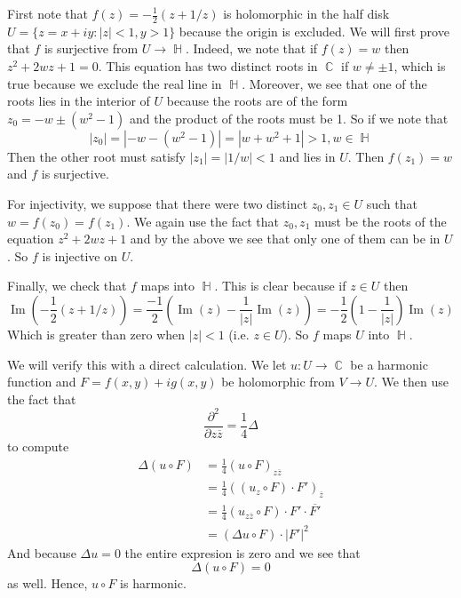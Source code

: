 \documentclass{article}
\DeclareMathOperator{\C}{\mathbb{C}}
\DeclareMathOperator{\Ha}{\mathbb{H}}
\DeclareMathOperator{\suchthat}{\mathrel{:}}
\newcommand{\exercise}[1]{\noindent{\textbf{Exercise #1:}}}
\newcommand{\der}[2]{\frac{\partial #1}{\partial #2}}
\newcommand{\conj}[1]{\overline{#1}}
\newcommand{\imag}{\mathrel{\text{Im}}}
\begin{document}
\exercise{8.5.5}

First note that $f(z) = -\frac{1}{2}(z + 1/z)$ is holomorphic in the
half disk $U = \{z = x+iy \suchthat |z| < 1, y>1\}$ because the origin
is excluded. We will first prove that $f$ is surjective from $U \to
\Ha$. Indeed, we note that if $f(z) = w$ then $z^2+2wz+1 = 0$. This
equation has two distinct roots in $\C$ if $w \neq \pm 1$, which is
true because we exclude the real line in $\Ha$. Moreover, we see that
one of the roots lies in the interior of $U$ because the roots
are of the form $z_0 = -w \pm (w^2-1)$ and the product of the roots
must be 1. So if we note that
\[
|z_0| = |-w - (w^2-1)| = |w+w^2+1| > 1, w \in \Ha
\]
Then the other root must satisfy $|z_1| = |1/w| < 1$ and lies in
$U$. Then $f(z_1) = w$ and $f$ is surjective.

For injectivity, we suppose that there were two distinct $z_0,z_1 \in
U$ such that $w = f(z_0) = f(z_1)$. We again use the fact that
$z_0,z_1$ must be the roots of the equation $z^2+2wz+1$ and by the
above we see that only one of them can be in $U$. So $f$ is injective
on $U$.

Finally, we check that $f$ maps into $\Ha$. This is clear because if $z
\in U$ then
\[
\imag{(-\frac{1}{2}(z+1/z))} = \frac{-1}{2}(\imag(z) -
\frac{1}{|z|}\imag(z)) = -\frac{1}{2}\left(1 - \frac{1}{|z|}\right)\imag(z)
\]
Which is greater than zero when $|z| < 1$ (i.e. $z \in U$). So $f$
maps $U$ into $\Ha$.

\exercise{8.5.6}

We will verify this with a direct calculation. We let $u:U\to\C$ be a
harmonic function and $F = f(x,y) + ig(x,y)$ be holomorphic from $V\to
U$. We then use the fact that
\[
\der{^2}{z\conj{z}} = \frac{1}{4}\Delta
\]
to compute
\begin{align*}
  \Delta(u \circ F) &= \frac{1}{4}(u \circ F)_{z\conj{z}} \\
  &= \frac{1}{4}((u_z \circ F)\cdot F')_{\conj{z}} \\
  &= \frac{1}{4}(u_{z\conj{z}} \circ F)\cdot F'\cdot\conj{F'} \\
  &= (\Delta u\circ F)\cdot |F'|^2
\end{align*}
And because $\Delta u = 0$ the entire expresion is zero and we see
that
\[
\Delta(u \circ F) = 0
\]
as well. Hence, $u \circ F$ is harmonic.
\end{document}
